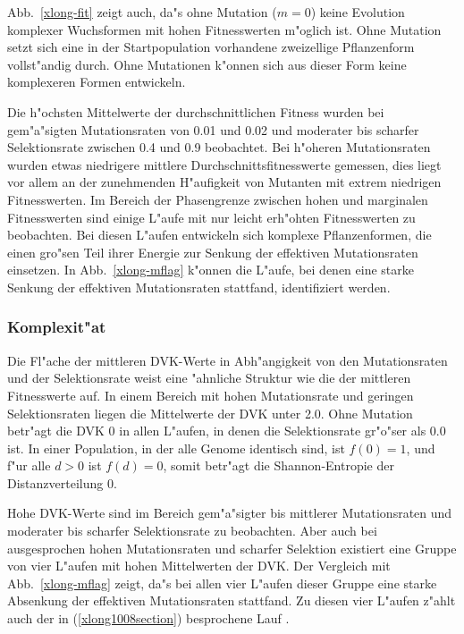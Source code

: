 Abb.\ \ref{xlong-fit} zeigt auch, da"s ohne Mutation ($m=0$) keine Evolution komplexer Wuchsformen mit
hohen Fitnesswerten m"oglich ist. Ohne Mutation setzt sich eine in der Startpopulation vorhandene
zweizellige Pflanzenform vollst"andig durch. Ohne Mutationen k"onnen sich aus dieser Form keine
komplexeren Formen entwickeln.

Die h"ochsten Mittelwerte der durchschnittlichen Fitness wurden bei gem"a"sigten Mutationsraten von
0.01 und 0.02 und moderater bis scharfer Selektionsrate zwischen 0.4 und 0.9 beobachtet. Bei h"oheren
Mutationsraten wurden etwas niedrigere mittlere Durchschnittsfitnesswerte gemessen, dies liegt vor
allem an der zunehmenden H"aufigkeit von Mutanten mit extrem niedrigen Fitnesswerten. Im Bereich der
Phasengrenze zwischen hohen und marginalen Fitnesswerten sind einige L"aufe mit nur leicht erh"ohten Fitnesswerten
zu beobachten. Bei diesen L"aufen entwickeln sich komplexe Pflanzenformen, die einen gro"sen Teil
ihrer Energie zur Senkung der effektiven Mutationsraten einsetzen. In Abb.\ \ref{xlong-mflag} k"onnen
die L"aufe, bei denen eine starke Senkung der effektiven Mutationsraten stattfand, identifiziert werden.


\subsubsection{Komplexit"at}
\label{lndgascan-complexity}

Die Fl"ache der mittleren DVK-Werte in Abh"angigkeit von den Mutationsraten und der Selektionsrate
weist eine "ahnliche Struktur wie die der mittleren Fitnesswerte auf. In einem Bereich mit hohen
Mutationsrate und geringen Selektionsraten liegen die Mittelwerte der DVK unter 2.0. Ohne Mutation
betr"agt die DVK 0 in allen L"aufen, in denen die Selektionsrate gr"o"ser als 0.0 ist. In einer
Population, in der alle Genome identisch sind, ist $f(0) = 1$, und f"ur alle $d>0$ ist $f(d) = 0$,
somit betr"agt die Shannon-Entropie der Distanzverteilung 0.

Hohe DVK-Werte sind im Bereich gem"a"sigter bis mittlerer Mutationsraten und moderater bis scharfer
Selektionsrate zu beobachten. Aber auch bei ausgesprochen hohen Mutationsraten und scharfer Selektion
existiert eine Gruppe von vier L"aufen mit hohen Mittelwerten der DVK. Der Vergleich mit Abb.\ \ref{xlong-mflag}
zeigt, da"s bei allen vier L"aufen dieser Gruppe eine starke Absenkung der effektiven Mutationsraten stattfand.
Zu diesen vier L"aufen z"ahlt auch der in (\ref{xlong1008section}) besprochene Lauf .


